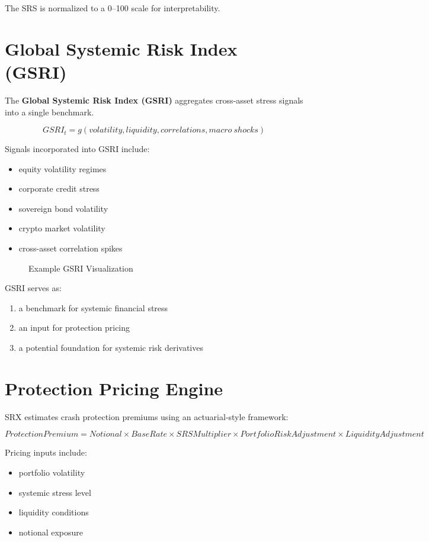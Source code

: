 \documentclass[11pt]{article}
\begin{document}
The SRS is normalized to a 0–100 scale for interpretability.

\section{Global Systemic Risk Index (GSRI)}

The \textbf{Global Systemic Risk Index (GSRI)} aggregates cross-asset stress signals into a single benchmark.

\[
GSRI_t = g(volatility, liquidity, correlations, macro\ shocks)
\]

Signals incorporated into GSRI include:

\begin{itemize}
\item equity volatility regimes
\item corporate credit stress
\item sovereign bond volatility
\item crypto market volatility
\item cross-asset correlation spikes
\end{itemize}

\begin{figure}[h]
\centering
{}
\caption{Example GSRI Visualization}
\end{figure}

GSRI serves as:

\begin{enumerate}
\item a benchmark for systemic financial stress
\item an input for protection pricing
\item a potential foundation for systemic risk derivatives
\end{enumerate}

\section{Protection Pricing Engine}

SRX estimates crash protection premiums using an actuarial-style framework:

\[
ProtectionPremium =
Notional \times BaseRate \times SRSMultiplier \times PortfolioRiskAdjustment \times LiquidityAdjustment
\]

Pricing inputs include:

\begin{itemize}
\item portfolio volatility
\item systemic stress level
\item liquidity conditions
\item notional exposure
\end{itemize}
\end{document}
